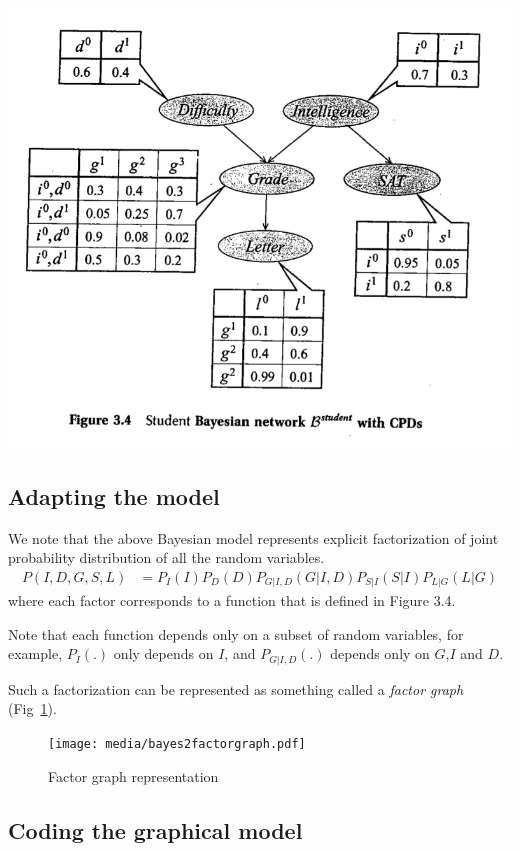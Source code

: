 \documentclass[12pt,oneside,letterpaper]{article}
\begin{document}
\includegraphics[width=\textwidth]{media/examplebayesnet.png}

\subsection{Adapting the model}
We note that the above Bayesian model represents explicit factorization of
joint probability distribution of all the random variables.
\begin{align}
  P(I, D, G, S, L) &= P_I(I)P_D(D)P_{G|I,D}(G|I, D)P_{S|I}(S|I)P_{L|G}(L|G)
\end{align}
where each factor corresponds to a function that is defined in Figure 3.4.

Note that each function depends only on a subset of random variables, for
example, $P_I(.)$ only depends on $I$, and $P_{G|I,D}(.)$ depends only on
$G$,$I$ and $D$.

Such a factorization can be represented as something called a \emph{factor
graph} (Fig~\ref{fig:fg2}). 

\begin{figure}
  \centering
  \texttt{[image: media/bayes2factorgraph.pdf]}
  \caption{Factor graph representation}
  \label{fig:fg2}
\end{figure}

\subsection{Coding the graphical model}
\end{document}

